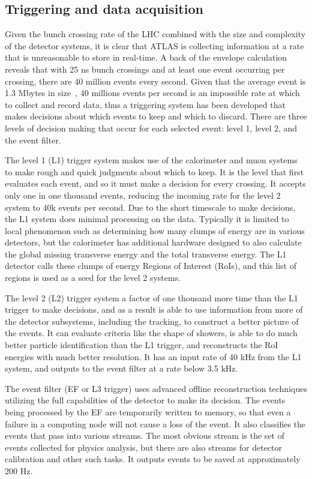 \subsection{Triggering and data acquisition}
\label{SECTION-ATLAS-TRIG}

Given the bunch crossing rate of the LHC combined with the size and complexity of the detector systems, it is clear that ATLAS is collecting information at a rate that is unreasonable to store in real-time. A back of the envelope calculation reveals that with 25 ns bunch crossings and at least one event occurring per crossing, there are 40 million events every second. Given that the average event is 1.3 Mbytes in size~\cite{ATLAS-EXP}, 40 millions events per second is an impossible rate at which to collect and record data, thus a triggering system has been developed that makes decisions about which events to keep and which to discard. There are three levels of decision making that occur for each selected event: level 1, level 2, and the event filter.

The level 1 (L1) trigger system makes use of the calorimeter and muon systems to make rough and quick judgments about which to keep. It is the level that first evaluates each event, and so it must make a decision for every crossing. It accepts only one in one thousand events, reducing the incoming rate for the level 2 system to 40k events per second. Due to the short timescale to make decisions, the L1 system does minimal processing on the data. Typically it is limited to local phenomenon such as determining how many clumps of energy are in various detectors, but the calorimeter has additional hardware designed to also calculate the global missing transverse energy and the total transverse energy. The L1 detector calls these clumps of energy Regions of Interest (RoIs), and this list of regions is used as a seed for the level 2 systems.

The level 2 (L2) trigger system a factor of one thousand more time than the L1 trigger to make decisions, and as a result is able to use information from more of the detector subsystems, including the tracking, to construct a better picture of the events. It can evaluate criteria like the shape of showers, is able to do much better particle identification than the L1 trigger, and reconstructs the RoI energies with much better resolution. It has an input rate of 40 kHz from the L1 system, and outputs to the event filter at a rate below 3.5 kHz.

The event filter (EF or L3 trigger) uses advanced offline reconstruction techniques utilizing the full capabilities of the detector to make its decision. The events being processed by the EF are temporarily written to memory, so that even a failure in a computing node will not cause a loss of the event. It also classifies the events that pass into various streams. The most obvious stream is the set of events collected for physics analysis, but there are also streams for detector calibration and other such tasks. It outputs events to be saved at approximately 200 Hz.


